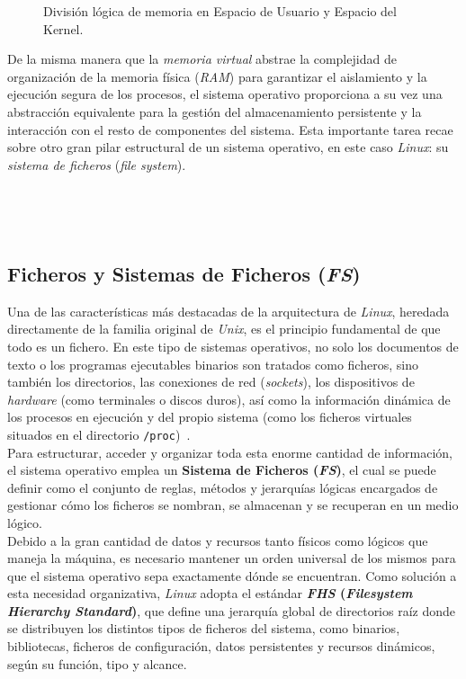 \begin{figure}[h!]
  \centering
  \scalebox{0.65}{}
  \caption{División lógica de memoria en Espacio de Usuario y Espacio del Kernel.}
  \label{fig:usr_krn_memory}
\end{figure}

De la misma manera que la \textit{memoria virtual} abstrae la complejidad de organización de la memoria física (\textit{RAM}) para garantizar el aislamiento y la ejecución segura de los procesos,
el sistema operativo proporciona a su vez una abstracción equivalente para la gestión del almacenamiento persistente y la interacción con el resto de componentes del sistema.
Esta importante tarea recae sobre otro gran pilar estructural de un sistema operativo, en este caso \textit{Linux}: su \textit{sistema de ficheros} (\textit{file system}).

\

\

\subsection{Ficheros y Sistemas de Ficheros (\textit{FS})}
\label{sec:fs}

Una de las características más destacadas de la arquitectura de \textit{Linux}, heredada directamente de la familia original de \textit{Unix}, es el principio fundamental de que \guillemotleft todo es un fichero\guillemotright.
En este tipo de sistemas operativos, no solo los documentos de texto o los programas ejecutables binarios son tratados como ficheros, sino también los directorios, las conexiones de red (\textit{sockets}), los dispositivos de \textit{hardware} (como terminales o discos duros),
así como la información dinámica de los procesos en ejecución y del propio sistema (como los ficheros virtuales situados en el directorio \texttt{/proc})~\cite{love_linux}.\\

Para estructurar, acceder y organizar toda esta enorme cantidad de información, el sistema operativo emplea un \textbf{Sistema de Ficheros (\textit{FS})}, el cual se puede definir como el conjunto de reglas, métodos y jerarquías lógicas encargados de gestionar cómo los ficheros se nombran, se almacenan y se recuperan en un medio lógico.\\

Debido a la gran cantidad de datos y recursos tanto físicos como lógicos que maneja la máquina, es necesario mantener un orden universal de los mismos para que el sistema operativo sepa exactamente dónde se encuentran.
Como solución a esta necesidad organizativa, \textit{Linux} adopta el estándar \textbf{\textit{FHS} (\textit{Filesystem Hierarchy Standard})}, que define una jerarquía global de directorios raíz donde se distribuyen los distintos tipos de ficheros del sistema, como binarios, bibliotecas, ficheros de configuración, datos persistentes y recursos dinámicos, según su función, tipo y alcance.\\


